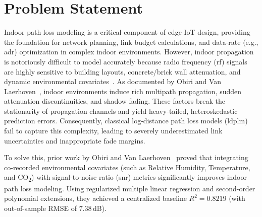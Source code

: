 \section{Problem Statement}
\label{sec:problem-statement}
Indoor path loss modeling is a critical component of edge IoT design, providing the foundation for network planning, link budget calculations, and data-rate (e.g., \gls{adr}) optimization in complex indoor environments. However, indoor propagation is notoriously difficult to model accurately because radio frequency (\gls{rf}) signals are highly sensitive to building layouts, concrete/brick wall attenuation, and dynamic environmental covariates~\cite{obiri2026environment}. As documented by Obiri and Van Laerhoven~\cite{obiri2026environment}, indoor environments induce rich multipath propagation, sudden attenuation discontinuities, and shadow fading. These factors break the stationarity of propagation channels and yield heavy-tailed, heteroskedastic prediction errors. Consequently, classical log-distance path loss models (\gls{ldplm}) fail to capture this complexity, leading to severely underestimated link uncertainties and inappropriate fade margins.

To solve this, prior work by Obiri and Van Laerhoven~\cite{obiri2026environment,obiri2025comprehensive} proved that integrating co-recorded environmental covariates (such as Relative Humidity, Temperature, and CO\textsubscript{2}) with signal-to-noise ratio (\gls{snr}) metrics significantly improves indoor path loss modeling. Using regularized multiple linear regression and second-order polynomial extensions, they achieved a centralized baseline $R^2 = 0.8219$ (with out-of-sample RMSE of $7.38$\,dB).

